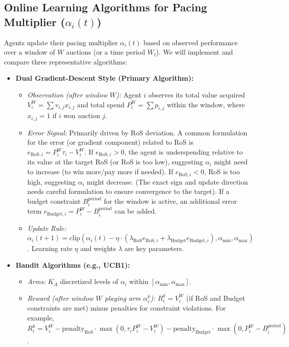 \documentclass[12pt, a4paper]{article}
\begin{document}
\subsection{Online Learning Algorithms for Pacing Multiplier ($\alpha_i(t)$)} \label{sec:learning_algorithms}
Agents update their pacing multiplier $\alpha_i(t)$ based on observed performance over a window of $W$ auctions (or a time period $W_t$). We will implement and compare three representative algorithms:
\begin{itemize}
    \item \textbf{Dual Gradient-Descent Style (Primary Algorithm):}
        \begin{itemize}
            \item \textit{Observation (after window $W$):} Agent $i$ observes its total value acquired $V_i^W = \sum v_{i,j} x_{i,j}$ and total spend $P_i^W = \sum p_{i,j}$ within the window, where $x_{i,j}=1$ if $i$ won auction $j$.
            \item \textit{Error Signal:} Primarily driven by RoS deviation. A common formulation for the error (or gradient component) related to RoS is $e_{\text{RoS},i} = P_i^W \tau_i - V_i^W$. If $e_{\text{RoS},i} > 0$, the agent is underspending relative to its value at the target RoS (or RoS is too low), suggesting $\alpha_i$ might need to increase (to win more/pay more if needed). If $e_{\text{RoS},i} < 0$, RoS is too high, suggesting $\alpha_i$ might decrease. (The exact sign and update direction needs careful formulation to ensure convergence to the target). If a budget constraint $B_i^{\text{period}}$ for the window is active, an additional error term $e_{\text{Budget},i} = P_i^W - B_i^{\text{period}}$ can be added.
            \item \textit{Update Rule:} $\alpha_i(t+1) = \text{clip}(\alpha_i(t) - \eta \cdot (\lambda_{\text{RoS}} e_{\text{RoS},i} + \lambda_{\text{Budget}} e_{\text{Budget},i}), \alpha_{\min}, \alpha_{\max})$. Learning rate $\eta$ and weights $\lambda$ are key parameters.
        \end{itemize}
    \item \textbf{Bandit Algorithms (e.g., UCB1):}
        \begin{itemize}
            \item \textit{Arms:} $K_A$ discretized levels of $\alpha_i$ within $[\alpha_{\min}, \alpha_{\max}]$.
            \item \textit{Reward (after window $W$ playing arm $\alpha_i^k$):} $R_i^k = V_i^W$ (if RoS and Budget constraints are met) minus penalties for constraint violations. For example, $R_i^k = V_i^W - \text{penalty}_{\text{RoS}} \cdot \max(0, \tau_i P_i^W - V_i^W) - \text{penalty}_{\text{Budget}} \cdot \max(0, P_i^W - B_i^{\text{period}})$.

\end{itemize}
\end{itemize}
\end{document}
